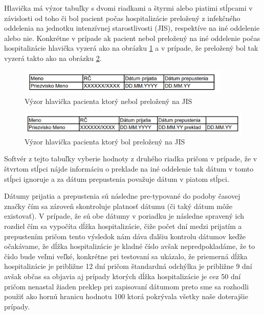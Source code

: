 Hlavička má výzor tabuľky s dvomi riadkami a štyrmi alebo piatimi stĺpcami v závislosti od toho či bol pacient počas hospitalizácie preložený z infekčného oddelenia na jednotku intenzívnej starostlivosti (JIS), respektíve na iné oddelenie alebo nie. Konkrétne v prípade ak pacient nebol preložený na iné oddelenie počas hospitalizácie hlavička vyzerá ako na obrázku \ref{obr:hlav_a} a v prípade, že preložený bol tak vyzerá takto ako na obrázku \ref{obr:hlav_b}.  

\begin{figure}
	\centerline{\includegraphics[width=0.9\textwidth]{images/hlavicka_a}}
	\caption[Hlavička a)]{Výzor hlavička pacienta ktorý nebol preložený na JIS}
	\label{obr:hlav_a}
\end{figure}

\begin{figure}
	\centerline{\includegraphics[width=1\textwidth]{images/hlavicka_b}}
	\caption[Hlavička b)]{Výzor hlavička pacienta ktorý bol preložený na JIS}
	\label{obr:hlav_b}
\end{figure}

Softvér z tejto tabuľky vyberie hodnoty z druhého riadka pričom v prípade, že v štvrtom stĺpci nájde informáciu o preklade na iné oddelenie tak dátum v tomto stĺpci ignoruje a za dátum prepustenia považuje dátum v piatom stĺpci.

Dátumy prijatia a prepustenia sú následne pre-typované do podoby časovej značky čím sa zároveň skontroluje platnosť dátumu (či taký dátum môže existovať). V prípade, že sú obe dátumy v poriadku je následne spravený ich rozdiel čím sa vypočíta dĺžka hospitalizácie, čiže počet dní medzi prijatím a prepustením pričom tento výsledok nám dáva ďalšiu kontrolu dátumov keďže očakávame, že dĺžka hospitalizácie je kladné číslo avšak nepredpokladáme, že to číslo bude veľmi veľké, konkrétne pri testovaní sa ukázalo, že priemerná dĺžka hospitalizácie je približne 12 dní pričom štandardná odchýlka je približne 9 dní avšak občas sa objavia aj prípady ktorých dĺžka hospitalizácie je cez 50 dní pričom nenastal žiaden preklep pri zapisovaní dátumom preto sme sa rozhodli použiť ako hornú hranicu hodnotu 100 ktorá pokrývala všetky naše doterajšie prípady.

